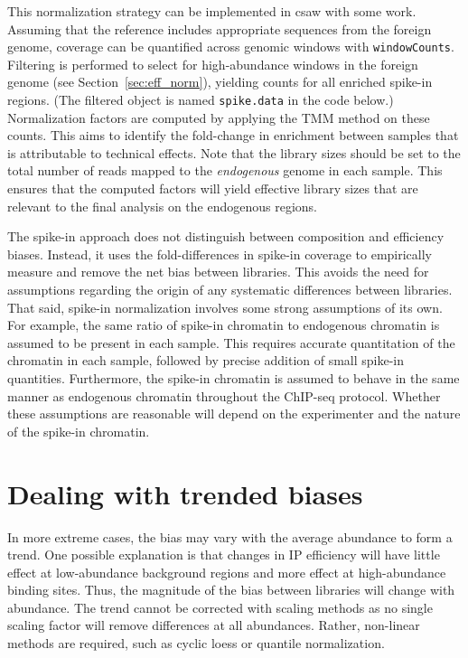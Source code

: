 \documentclass[12pt]{report}
\renewenvironment{Schunk}{\vspace{0pt}}{\vspace{0pt}}
\newcommand{\pkgname}{csaw}
\newcommand{\code}[1]{{\small\texttt{#1}}}
\begin{document}
This normalization strategy can be implemented in \pkgname{} with some work.
Assuming that the reference includes appropriate sequences from the foreign genome, coverage can be quantified across genomic windows with \code{windowCounts}.
Filtering is performed to select for high-abundance windows in the foreign genome (see Section~\ref{sec:eff_norm}), yielding counts for all enriched spike-in regions.
(The filtered object is named \code{spike.data} in the code below.)
Normalization factors are computed by applying the TMM method on these counts.
This aims to identify the fold-change in enrichment between samples that is attributable to technical effects.
Note that the library sizes should be set to the total number of reads mapped to the \textit{endogenous} genome in each sample.
This ensures that the computed factors will yield effective library sizes that are relevant to the final analysis on the endogenous regions.


\begin{Schunk}
\end{Schunk}

The spike-in approach does not distinguish between composition and efficiency biases.
Instead, it uses the fold-differences in spike-in coverage to empirically measure and remove the net bias between libraries.
This avoids the need for assumptions regarding the origin of any systematic differences between libraries.
That said, spike-in normalization involves some strong assumptions of its own.
For example, the same ratio of spike-in chromatin to endogenous chromatin is assumed to be present in each sample.
This requires accurate quantitation of the chromatin in each sample, followed by precise addition of small spike-in quantities.
Furthermore, the spike-in chromatin is assumed to behave in the same manner as endogenous chromatin throughout the ChIP-seq protocol.
Whether these assumptions are reasonable will depend on the experimenter and the nature of the spike-in chromatin.

\section{Dealing with trended biases}
In more extreme cases, the bias may vary with the average abundance to form a trend. 
One possible explanation is that changes in IP efficiency will have little effect at low-abundance background regions and more effect at high-abundance binding sites. 
Thus, the magnitude of the bias between libraries will change with abundance. 
The trend cannot be corrected with scaling methods as no single scaling factor will remove differences at all abundances.
Rather, non-linear methods are required, such as cyclic loess or quantile normalization.
\end{document}
